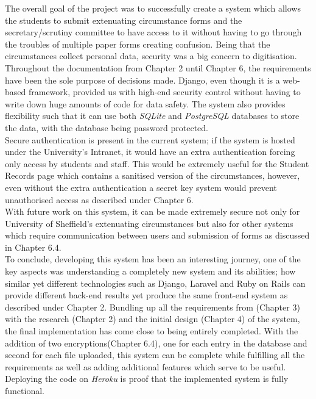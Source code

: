 \documentclass[../main.tex]{subfiles}
\begin{document}
\raggedright
The overall goal of the project was to successfully create a system which allows the students to submit extenuating circumstance forms and the secretary/scrutiny committee to have access to it without having to go through the troubles of multiple paper forms creating confusion. Being that the circumstances collect personal data, security was a big concern to digitisation. Throughout the documentation from Chapter 2 until Chapter 6, the requirements have been the sole purpose of decisions made. Django, even though it is a web-based framework, provided us with high-end security control without having to write down huge amounts of code for data safety. The system also provides flexibility such that it can use both \textit{SQLite} and \textit{PostgreSQL} databases to store the data, with the database being password protected. \\[4mm]

Secure authentication is present in the current system; if the system is hosted under the University's Intranet, it would have an extra authentication forcing only access by students and staff. This would be extremely useful for the Student Records page which contains a sanitised version of the circumstances, however, even without the extra authentication a secret key system would prevent unauthorised access as described under Chapter 6. \\[4mm]

With future work on this system, it can be made extremely secure not only for University of Sheffield's extenuating circumstances but also for other systems which require communication between users and submission of forms as discussed in Chapter 6.4. \\[4mm]

To conclude, developing this system has been an interesting journey, one of the key aspects was understanding a completely new system and its abilities; how similar yet different technologies such as Django, Laravel and Ruby on Rails can provide different back-end results yet produce the same front-end system as described under Chapter 2. Bundling up all the requirements from (Chapter 3) with the research (Chapter 2) and the initial design (Chapter 4) of the system, the final implementation has come close to being entirely completed. With the addition of two encryptions(Chapter 6.4), one for each entry in the database and second for each file uploaded, this system can be complete while fulfilling all the requirements as well as adding additional features which serve to be useful. Deploying the code on \textit{Heroku} is proof that the implemented system is fully functional.
\end{document}
